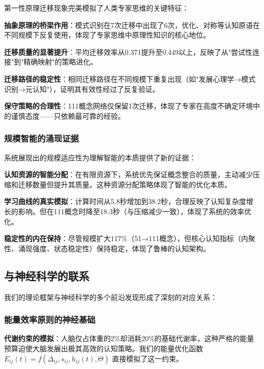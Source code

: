\documentclass[12pt,a4paper]{article}
\begin{document}
第一性原理迁移现象完美模拟了人类专家思维的关键特征：

\textbf{抽象原理的桥梁作用}：模式识别在7次迁移中出现了6次，优化、对称等认知原语在不同规模下反复使用，体现了专家思维中原理性知识的核心地位。

\textbf{迁移质量的显著提升}：平均迁移效率从0.371提升至0.449以上，反映了从"尝试性连接"到"精确映射"的策略进化。

\textbf{迁移路径的稳定性}：相同迁移路径在不同规模下重复出现（如"发展心理学→模式识别→元认知"），证明其有效性经过了反复验证。

\textbf{保守策略的合理性}：111概念网络仅保留1次迁移，体现了专家在高度不确定环境中的谨慎态度——只依赖最可靠的经验。

\subsubsection{规模智能的涌现证据}

系统展现出的规模适应性为理解智能的本质提供了新的证据：

\textbf{认知资源的智能分配}：在有限资源下，系统优先保证概念整合的质量，主动减少压缩和迁移数量但提升其质量。这种资源分配策略体现了智能的优化本质。

\textbf{学习曲线的真实模拟}：计算时间从5.8秒增加到38.2秒，合理反映了认知复杂度增长的影响。但在111概念时降至18.3秒（与压缩减少一致），体现了系统的效率优化。

\textbf{稳定性的内在保持}：尽管规模扩大117\%（51→111概念），但核心认知指标（内聚性、涌现强度、状态稳定性）保持稳定，体现了鲁棒的认知架构。

\subsection{与神经科学的联系}

我们的理论框架与神经科学的多个前沿发现形成了深刻的对应关系：

\subsubsection{能量效率原则的神经基础}

\textbf{代谢约束的模拟}：人脑仅占体重的2\%却消耗20\%的基础代谢率，这种严格的能量预算迫使大脑发展出极其高效的认知策略。我们的能量优化函数 $E_{ij}(t) = f(\Delta_{ij}, s_{ij}, h_{ij}(t), \Theta)$ 直接模拟了这一约束。
\end{document}
